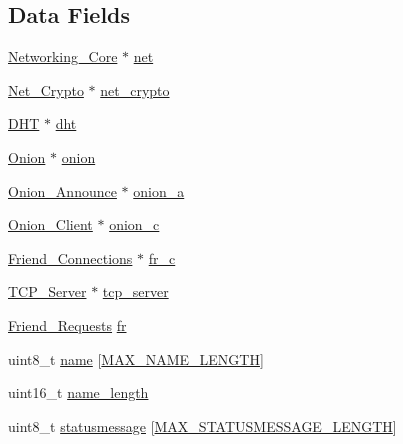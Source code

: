 \subsection*{Data Fields}
\begin{DoxyCompactItemize}
\item 
\hyperlink{struct_networking___core}{Networking\+\_\+\+Core} $\ast$ \hyperlink{struct_messenger_aa14ea2f67950f57fe4235d7375a2216c}{net}
\item 
\hyperlink{struct_net___crypto}{Net\+\_\+\+Crypto} $\ast$ \hyperlink{struct_messenger_ab06a41217a1e9b5985555e19e088ae94}{net\+\_\+crypto}
\item 
\hyperlink{struct_d_h_t}{D\+H\+T} $\ast$ \hyperlink{struct_messenger_a8b3d6ce8745acc52695e252bdb1531b6}{dht}
\item 
\hyperlink{struct_onion}{Onion} $\ast$ \hyperlink{struct_messenger_a66fb4bf67c711a5ed3e7bbecec7fde30}{onion}
\item 
\hyperlink{struct_onion___announce}{Onion\+\_\+\+Announce} $\ast$ \hyperlink{struct_messenger_a3a345721fb6be385f4b4519679a4609f}{onion\+\_\+a}
\item 
\hyperlink{struct_onion___client}{Onion\+\_\+\+Client} $\ast$ \hyperlink{struct_messenger_ae202b81f9a2c2fa80fd310a0996795fc}{onion\+\_\+c}
\item 
\hyperlink{struct_friend___connections}{Friend\+\_\+\+Connections} $\ast$ \hyperlink{struct_messenger_ae26eb43a606fff20fe70209d051c40f9}{fr\+\_\+c}
\item 
\hyperlink{struct_t_c_p___server}{T\+C\+P\+\_\+\+Server} $\ast$ \hyperlink{struct_messenger_afc53e878009e340983270593e62cadef}{tcp\+\_\+server}
\item 
\hyperlink{struct_friend___requests}{Friend\+\_\+\+Requests} \hyperlink{struct_messenger_ae46787dbb8f8dce47f8fdc6192cf788d}{fr}
\item 
uint8\+\_\+t \hyperlink{struct_messenger_a11b8cc6595eea79e65c978209278e683}{name} \mbox{[}\hyperlink{_messenger_8h_a0c397a708cec89c74029582574516b30}{M\+A\+X\+\_\+\+N\+A\+M\+E\+\_\+\+L\+E\+N\+G\+T\+H}\mbox{]}
\item 
uint16\+\_\+t \hyperlink{struct_messenger_a3573d7a906b26e9999cd74f2c4066601}{name\+\_\+length}
\item 
uint8\+\_\+t \hyperlink{struct_messenger_a8f12612ac1191135a1a5b1cbcbc82852}{statusmessage} \mbox{[}\hyperlink{_messenger_8h_a0d1a4b91dd43b4cb07dfefab7fc6bee1}{M\+A\+X\+\_\+\+S\+T\+A\+T\+U\+S\+M\+E\+S\+S\+A\+G\+E\+\_\+\+L\+E\+N\+G\+T\+H}\mbox{]}
\item 

\end{DoxyCompactItemize}
